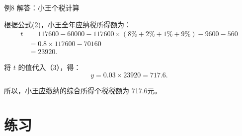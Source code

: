 \documentclass[10pt,aspectratio=169,serif]{beamer}
\begin{document}
\begin{frame}[t]{例8 解答：小王个税计算}
\begin{tcolorbox}[colback=orange!10,colframe=orange,title=\textbf{解：(2)}]
根据公式(2)，小王全年应纳税所得额为：
\[
\begin{aligned}
t &= 117600 - 60000 - 117600 \times (8\% + 2\% + 1\% + 9\%) - 9600 - 560 \\
&= 0.8 \times 117600 - 70160 \\
&= 23920.
\end{aligned}
\]

将 $t$ 的值代入（3），得：
\[
y = 0.03 \times 23920 = 717.6.
\]

所以，小王应缴纳的综合所得个税税额为 \alert{717.6元}。
\end{tcolorbox}
\end{frame}

\section{练习}
\end{document}
